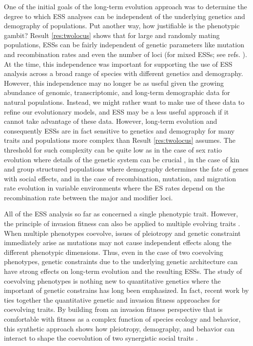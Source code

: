 \documentclass[11pt]{article}
\begin{document}
One of the initial goals of the long-term evolution approach was to determine the degree to which ESS analyses can be independent of the underlying genetics and demography of populations. Put another way, how justifiable is the phenotypic gambit? Result \ref{res:twolocus} shows that for large and randomly mating populations, ESSs can be fairly independent of genetic parameters like mutation and recombination rates and even the number of loci (for mixed ESSs; see refs. \cite{Eshel:Feldman:1998,Eshel:Feldman:2001}). At the time, this independence was important for supporting the use of ESS analysis across a broad range of species with different genetics and demography. However, this independence may no longer be as useful given the growing abundance of genomic, transcriptomic, and long-term demographic data for natural populations. Instead, we might rather want to make use of these data to refine our evolutionary models, and ESS may be a less useful approach if it cannot take advantage of these data. However, long-term evolution and consequently ESSs are in fact sensitive to genetics and demography for many traits and populations more complex than Result \ref{res:twolocus} assumes. The threshold for such complexity can be quite low as in the case of sex ratio evolution where details of the genetic system can be crucial \cite{Hamilton:1967,Eshel:Feldman:1982a,Wu:1983,Taylor:Jaenike:2002}, in the case of kin and group structured populations where demography determines the fate of genes with social effects, and in the case of recombination, mutation, and migration rate evolution in variable environments where the ES rates depend on the recombination rate between the major and modifier loci.

All of the ESS analysis so far as concerned a single phenotypic trait. However, the principle of invasion fitness can also be applied to multiple evolving traits \cite{Leimar:2009,Mullon:Keller:2016,Mullon:Lehmann:2019}. When multiple phenotypes coevolve, issues of pleiotropy and genetic constraint immediately arise as mutations may not cause independent effects along the different phenotypic dimensions. Thus, even in the case of two coevolving phenotypes, genetic constraints due to the underlying genetic architecture can have strong effects on long-term evolution and the resulting ESSs. The study of coevolving phenotypes is nothing new to quantitative genetics \cite{Lande:1979,Lande:Arnold:1983,Phillips:Arnold:1989} where the important of genetic constrains has long been emphasized. In fact, recent work by \citeauthor{Mullon:Lehmann:2019} \cite{Mullon:Lehmann:2019} ties together the quantitative genetic and invasion fitness approaches for coevolving traits. By building from an invasion fitness perspective that is comfortable with fitness as a complex function of species ecology and behavior, this synthetic approach shows how pleiotropy, demography, and behavior can interact to shape the coevolution of two synergistic social traits \cite{Mullon:Lehmann:2019}.
\end{document}
